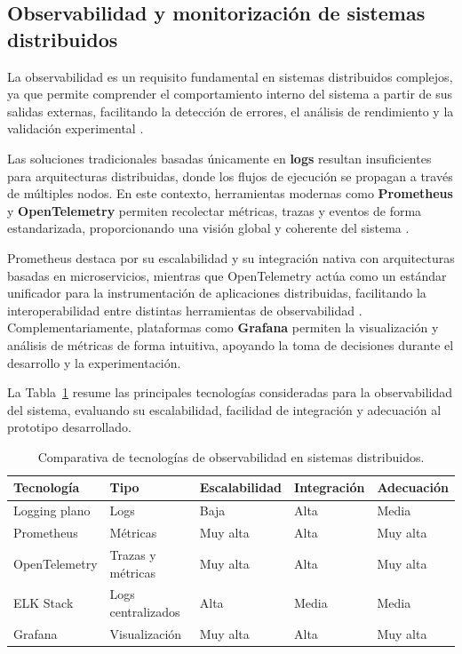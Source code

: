 \documentclass{report}
\begin{document}
\subsection{Observabilidad y monitorización de sistemas distribuidos}
\label{sec:observabilidad}

La observabilidad es un requisito fundamental en sistemas distribuidos complejos, ya que permite comprender el comportamiento interno del sistema a partir de sus salidas externas, facilitando la detección de errores, el análisis de rendimiento y la validación experimental \cite{sigelman2010dapper}.

Las soluciones tradicionales basadas únicamente en \textbf{logs} resultan insuficientes para arquitecturas distribuidas, donde los flujos de ejecución se propagan a través de múltiples nodos. En este contexto, herramientas modernas como \textbf{Prometheus} y \textbf{OpenTelemetry} permiten recolectar métricas, trazas y eventos de forma estandarizada, proporcionando una visión global y coherente del sistema \cite{prometheus2018}.

Prometheus destaca por su escalabilidad y su integración nativa con arquitecturas basadas en microservicios, mientras que OpenTelemetry actúa como un estándar unificador para la instrumentación de aplicaciones distribuidas, facilitando la interoperabilidad entre distintas herramientas de observabilidad \cite{opentelemetry2023}. Complementariamente, plataformas como \textbf{Grafana} permiten la visualización y análisis de métricas de forma intuitiva, apoyando la toma de decisiones durante el desarrollo y la experimentación.

La Tabla~\ref{tab:comparativa-observabilidad} resume las principales tecnologías consideradas para la observabilidad del sistema, evaluando su escalabilidad, facilidad de integración y adecuación al prototipo desarrollado.


\begin{table}[H]
\centering
\footnotesize
\caption{Comparativa de tecnologías de observabilidad en sistemas distribuidos.}
\label{tab:comparativa-observabilidad}
\renewcommand{\arraystretch}{1.2}
\setlength{\tabcolsep}{3pt}

\begin{tabularx}{\linewidth}{p{2.4cm} p{2.4cm} p{2cm} p{2cm} X}
\toprule
\textbf{Tecnología} & \textbf{Tipo} & \textbf{Escalabilidad} & \textbf{Integración} & \textbf{Adecuación} \\
\midrule
Logging plano & Logs & Baja & Alta & Media \\
Prometheus & Métricas & Muy alta & Alta & Muy alta \\
OpenTelemetry & Trazas y métricas & Muy alta & Alta & Muy alta \\
ELK Stack & Logs centralizados & Alta & Media & Media \\
Grafana & Visualización & Muy alta & Alta & Muy alta \\
\bottomrule
\end{tabularx}
\end{table}
\end{document}

